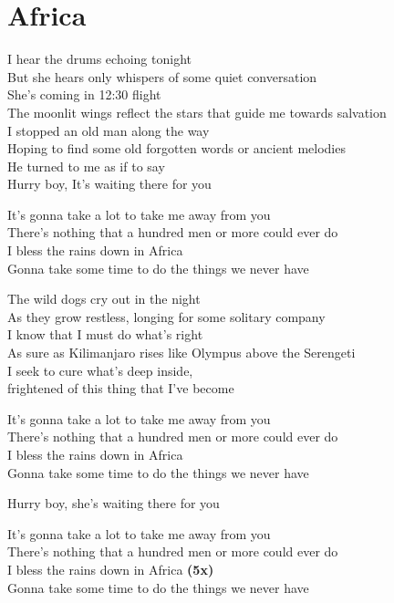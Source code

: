 \section{Africa}
I hear the drums echoing tonight\\
But she hears only whispers of some quiet conversation\\
She's coming in 12:30 flight\\
The moonlit wings reflect the stars that guide me towards salvation\\
I stopped an old man along the way\\
Hoping to find some old forgotten words or ancient melodies\\
He turned to me as if to say\\
Hurry boy, It's waiting there for you

It's gonna take a lot to take me away from you\\
There's nothing that a hundred men or more could ever do\\
I bless the rains down in Africa\\
Gonna take some time to do the things we never have

The wild dogs cry out in the night\\
As they grow restless, longing for some solitary company\\
I know that I must do what's right\\
As sure as Kilimanjaro rises like Olympus above the Serengeti\\
I seek to cure what's deep inside,\\
frightened of this thing that I've become

It's gonna take a lot to take me away from you\\
There's nothing that a hundred men or more could ever do\\
I bless the rains down in Africa\\
Gonna take some time to do the things we never have

Hurry boy, she's waiting there for you

It's gonna take a lot to take me away from you\\
There's nothing that a hundred men or more could ever do\\
I bless the rains down in Africa \textbf{(5x)}\\
Gonna take some time to do the things we never have
